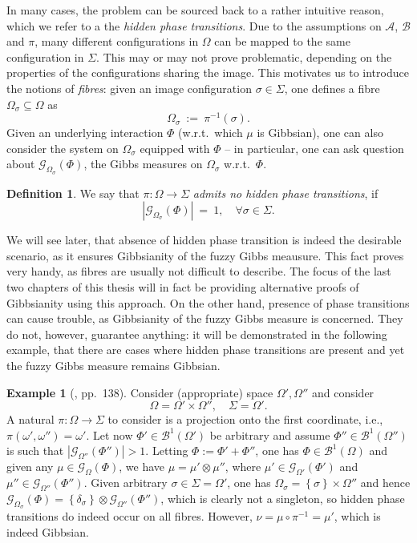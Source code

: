 \documentclass[12pt]{article}
\newcommand{\A}{\mathcal{A}}
\newcommand{\B}{\mathcal{B}}
\newcommand{\BB}{\mathscr{B}}
\newcommand{\G}{\mathcal{G}}
\newcommand{\set}[1]{\left\{#1\right\}}
\newcommand{\ra}{\rightarrow}
\newcommand{\1}{\mathbbm{1}}
\newcommand{\5}{\vspace{0.5cm}}
\theoremstyle{definition}
\newtheorem{ex}[thm]{Example}
\newtheorem{df}[thm]{Definition}
\begin{document}
In many cases, the problem can be sourced back to a rather intuitive reason, which we refer to a the \textit{hidden phase transitions}. Due to the assumptions on $\A$, $\B$ and $\pi$, many different configurations in $\Omega$ can be mapped to the same configuration in $\Sigma$. This may or may not prove problematic, depending on the properties of the configurations sharing the image. This motivates us to introduce the notions of \textit{fibres}: given an image configuration $\sigma\in\Sigma$, one defines a fibre $\Omega_\sigma\subseteq\Omega$ as
$$\Omega_\sigma ~:=~ \pi^{-1}(\sigma).$$
Given an underlying interaction $\Phi$ (w.r.t.~which $\mu$ is Gibbsian), one can also consider the system on $\Omega_\sigma$ equipped with $\Phi$ -- in particular, one can ask question about $\G_{\Omega_\sigma}(\Phi)$, the Gibbs measures on $\Omega_\sigma$ w.r.t.~$\Phi$. 
\begin{df}
We say that $\pi:\Omega\ra\Sigma$ \textit{admits no hidden phase transitions}, if 
$$|\G_{\Omega_\sigma}(\Phi)| ~=~ 1, \quad \forall \sigma\in\Sigma.$$
\end{df}
We will see later, that absence of hidden phase transition is indeed the desirable scenario, as it ensures Gibbsianity of the fuzzy Gibbs meausure. This fact proves very handy, as fibres are usually not difficult to describe. The focus of the last two chapters of this thesis will in fact be providing alternative proofs of Gibbsianity using this approach. On the other hand, presence of phase transitions can cause trouble, as Gibbsianity of the fuzzy Gibbs measure is concerned. They do not, however, guarantee anything: it will be demonstrated in the following example, that there are cases where hidden phase transitions are present and yet the fuzzy Gibbs measure remains Gibbsian.

\begin{ex}[\cite{Ber}, pp.~138]
Consider (appropriate) space $\Omega',\Omega''$ and consider
$$\Omega=\Omega'\times\Omega'',\quad\Sigma=\Omega'.$$
A natural $\pi:\Omega\ra\Sigma$ to consider is a projection onto the first coordinate, i.e., $\pi(\omega',\omega'')=\omega'$. Let now $\Phi'\in\BB^1(\Omega')$ be arbitrary and assume $\Phi''\in\BB^1(\Omega'')$ is such that $|\G_{\Omega''}(\Phi'')|>1$. Letting $\Phi:=\Phi'+\Phi''$, one has $\Phi\in\BB^1(\Omega)$ and given any $\mu\in\G_{\Omega}(\Phi)$, we have $\mu=\mu'\otimes\mu''$, where $\mu'\in\G_{\Omega'}(\Phi')$ and $\mu''\in\G_{\Omega''}(\Phi'')$. Given arbitrary $\sigma\in\Sigma=\Omega'$, one has $\Omega_\sigma=\set{\sigma}\times\Omega''$ and hence $\G_{\Omega_\sigma}(\Phi)=\set{\delta_\sigma}\otimes\G_{\Omega''}(\Phi'')$, which is clearly not a singleton, so hidden phase transitions do indeed occur on all fibres. However, $\nu=\mu\circ\pi^{-1}=\mu'$, which is indeed Gibbsian.
\end{ex}
\end{document}
